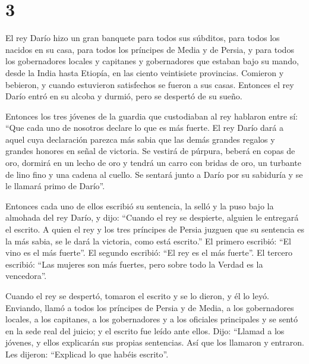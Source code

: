 \hypertarget{section-2}{%
\section{3}\label{section-2}}

 El rey Darío hizo un gran banquete para todos sus
súbditos, para todos los nacidos en su casa, para todos los príncipes de
Media y de Persia,  y para todos los gobernadores locales
y capitanes y gobernadores que estaban bajo su mando, desde la India
hasta Etiopía, en las ciento veintisiete provincias. 
Comieron y bebieron, y cuando estuvieron satisfechos se fueron a sus
casas. Entonces el rey Darío entró en su alcoba y durmió, pero se
despertó de su sueño.

 Entonces los tres jóvenes de la guardia que custodiaban
al rey hablaron entre sí:  ``Que cada uno de nosotros
declare lo que es más fuerte. El rey Darío dará a aquel cuya declaración
parezca más sabia que las demás grandes regalos y grandes honores en
señal de victoria.  Se vestirá de púrpura, beberá en copas
de oro, dormirá en un lecho de oro y tendrá un carro con bridas de oro,
un turbante de lino fino y una cadena al cuello.  Se
sentará junto a Darío por su sabiduría y se le llamará primo de Darío''.

 Entonces cada uno de ellos escribió su sentencia, la
selló y la puso bajo la almohada del rey Darío,  y dijo:
``Cuando el rey se despierte, alguien le entregará el escrito. A quien
el rey y los tres príncipes de Persia juzguen que su sentencia es la más
sabia, se le dará la victoria, como está escrito.''  El
primero escribió: ``El vino es el más fuerte''.  El
segundo escribió: ``El rey es el más fuerte''.  El
tercero escribió: ``Las mujeres son más fuertes, pero sobre todo la
Verdad es la vencedora''.

 Cuando el rey se despertó, tomaron el escrito y se lo
dieron, y él lo leyó.  Enviando, llamó a todos los
príncipes de Persia y de Media, a los gobernadores locales, a los
capitanes, a los gobernadores y a los oficiales principales
 y se sentó en la sede real del juicio; y el escrito fue
leído ante ellos.  Dijo: ``Llamad a los jóvenes, y ellos
explicarán sus propias sentencias. Así que los llamaron y entraron.
 Les dijeron: ``Explicad lo que habéis escrito''.

